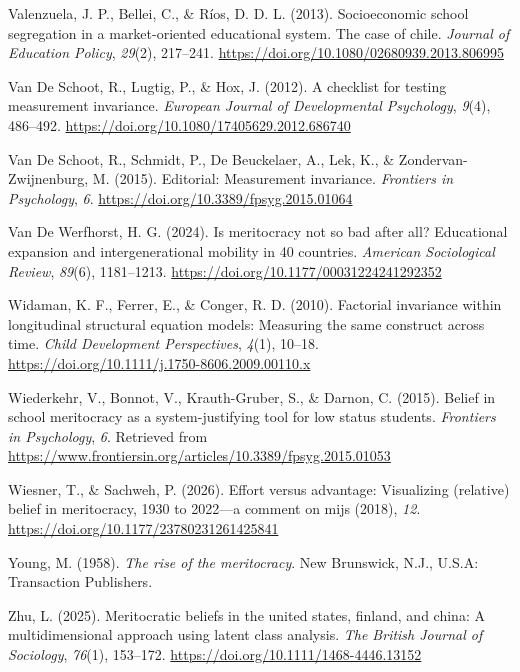 \documentclass[
  13pt,
]{article}
\newlength{\cslhangindent}
\newenvironment{CSLReferences}[2] %
 {\begin{list}{}{%
  \setlength{\itemindent}{0pt}
  \setlength{\leftmargin}{0pt}
  \setlength{\parsep}{0pt}
  \ifodd #1
   \setlength{\leftmargin}{\cslhangindent}
   \setlength{\itemindent}{-1\cslhangindent}
  \fi
  \setlength{\itemsep}{#2\baselineskip}}}
 {\end{list}}
\begin{document}
\begin{CSLReferences}{1}{0}
Valenzuela, J. P., Bellei, C., \& Ríos, D. D. L. (2013). Socioeconomic
school segregation in a market-oriented educational system. The case of
chile. \emph{Journal of Education Policy}, \emph{29}(2), 217--241.
\url{https://doi.org/10.1080/02680939.2013.806995}

Van De Schoot, R., Lugtig, P., \& Hox, J. (2012). A checklist for
testing measurement invariance. \emph{European Journal of Developmental
Psychology}, \emph{9}(4), 486--492.
\url{https://doi.org/10.1080/17405629.2012.686740}

Van De Schoot, R., Schmidt, P., De Beuckelaer, A., Lek, K., \&
Zondervan-Zwijnenburg, M. (2015). Editorial: Measurement invariance.
\emph{Frontiers in Psychology}, \emph{6}.
\url{https://doi.org/10.3389/fpsyg.2015.01064}

Van De Werfhorst, H. G. (2024). Is meritocracy not so bad after all?
Educational expansion and intergenerational mobility in 40 countries.
\emph{American Sociological Review}, \emph{89}(6), 1181--1213.
\url{https://doi.org/10.1177/00031224241292352}

Widaman, K. F., Ferrer, E., \& Conger, R. D. (2010). Factorial
invariance within longitudinal structural equation models: Measuring the
same construct across time. \emph{Child Development Perspectives},
\emph{4}(1), 10--18.
\url{https://doi.org/10.1111/j.1750-8606.2009.00110.x}

Wiederkehr, V., Bonnot, V., Krauth-Gruber, S., \& Darnon, C. (2015).
Belief in school meritocracy as a system-justifying tool for low status
students. \emph{Frontiers in Psychology}, \emph{6}. Retrieved from
\url{https://www.frontiersin.org/articles/10.3389/fpsyg.2015.01053}

Wiesner, T., \& Sachweh, P. (2026). Effort versus advantage: Visualizing
(relative) belief in meritocracy, 1930 to 2022---a comment on mijs
(2018), \emph{12}. \url{https://doi.org/10.1177/23780231261425841}

Young, M. (1958). \emph{The rise of the meritocracy}. New Brunswick,
N.J., U.S.A: Transaction Publishers.

Zhu, L. (2025). Meritocratic beliefs in the united states, finland, and
china: A multidimensional approach using latent class analysis.
\emph{The British Journal of Sociology}, \emph{76}(1), 153--172.
\url{https://doi.org/10.1111/1468-4446.13152}

\end{CSLReferences}
\end{document}

